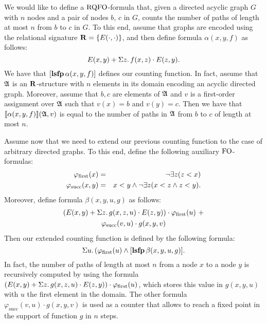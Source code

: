 \begin{example}
We would like to define a ${\rm RQFO}$-formula that, given a directed acyclic graph $G$ with $n$ nodes and a pair of nodes $b$, $c$ in $G$, counts the number of paths of length at most $n$ from $b$ to $c$ in $G$. To this end, assume that graphs are encoded using the relational signature $\mathbf{R} = \{ E(\cdot,\cdot) \}$, and then define formula $\alpha(x, y, f)$ as follows:
$$
E(x,y) + \Sigma{z}.\, f(x,z)\cdot E(z,y).
$$
We have that $[{\bf lsfp} \, \alpha(x,y,f)]$ defines our counting function. In fact, assume that $\mathfrak{A}$ is an $\mathbf{R}$-structure with $n$ elements in its domain encoding an acyclic directed graph. Moreover, assume that $b,c$ are elements of $\mathfrak{A}$ and $v$ is a first-order assignment over $\mathfrak{A}$ such that $v(x) = b$ and $v(y) = c$. Then we have that ${\llbracket{}{\alpha(x,y,f)}\rrbracket}(\mathfrak{A},v)$ is equal to the  number of paths in $\mathfrak{A}$ from $b$ to $c$ of length at most $n$.

Assume now that we need to extend our previous counting function to the case of arbitrary directed graphs. To this end, define the following auxiliary ${\rm FO}$-formulas:
\begin{eqnarray*}
\varphi_{\text{\rm first}}(x) & = & \neg \exists z (z < x)\\
\varphi_{\text{succ}}(x,y) & = & x < y \wedge \neg \exists z ( x < z \wedge z < y).
\end{eqnarray*}
Moreover, define formula $\beta(x, y, u, g)$ as follows:
\begin{multline*}
(E(x,y) + \Sigma{z}.\, g(x,z,u)\cdot E(z,y)) \cdot \varphi_{\text{\rm first}}(u) \ +\\
\varphi_{\text{succ}}(v,u) \cdot g(x,y,v)
\end{multline*}
Then our extended counting function is defined by the following formula:
$$
\Sigma{u}.\, (\varphi_{\text{\rm first}}(u) \wedge [{\bf lsfp} \, \beta(x,y,u,g)].
$$ 
In fact, the number of paths of length at most $n$ from a node $x$ to a node $y$ is recursively computed by using the formula $(E(x,y) + \Sigma{z}.\, g(x,z,u)\cdot E(z,y)) \cdot \varphi_{\text{\rm first}}(u)$, which stores this value in $g(x,y,u)$ with $u$ the first element in the domain.  The other formula $\varphi_{\text{succ}}(v,u) \cdot g(x,y,v)$ is used as a counter that allows to reach a fixed point in the support of function $g$ in $n$ steps.
\end{example}

%
%

